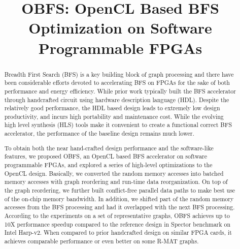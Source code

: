 \documentclass[conference]{IEEEtran}
\begin{document}
%
\title{OBFS: OpenCL Based BFS Optimization on Software Programmable FPGAs}

\maketitle

\begin{abstract}
    Breadth First Search (BFS) is a key building block of graph processing 
	and there have been considerable efforts devoted to accelerating BFS on FPGAs
	for the sake of both performance and energy efficiency. While prior work 
	typically built the BFS accelerator through handcrafted circuit using 
	hardware description language (HDL). Despite the relatively good performance, 
	the HDL based design leads to extremely low design productivity, and incurs 
	high portability and maintenance cost. While the evolving high level synthesis (HLS) 
	tools make it convenient to create a functional correct BFS accelerator, 
	the performance of the baseline design remains much lower. 

	To obtain both the near hand-crafted design performance and the software-like features, 
	we proposed OBFS, an OpenCL based BFS accelerator on software programmable FPGAs, 
	and explored a series of high-level optimizations to the OpenCL design. 
	Basically, we converted the random memory accesses into batched 
	memory accesses with graph reordering and run-time data reorganization. 
	On top of the graph reordering, we further built conflict-free parallel data paths 
	to make best use of the on-chip memory bandwidth. In addition, we shifted part of 
	the random memory accesses from the BFS processing and had it overlapped with the 
	next BFS processing. According to the experiments on a set of representative graphs, 
	OBFS achieves up to 10X performance speedup compared to the reference design 
	in Spector benchmark on Intel Harp-v2. When compared to prior handcrafted design on 
	similar FPGA cards, it achieves comparable performance or even better on some R-MAT graphs. 
\end{abstract}
\end{document}
